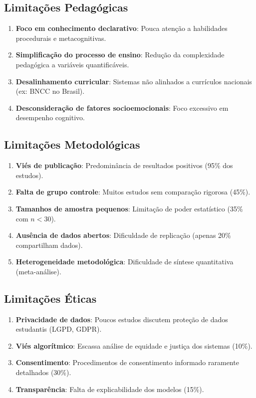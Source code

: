 \subsection{Limitações Pedagógicas}

\begin{enumerate}
    \item \textbf{Foco em conhecimento declarativo}: Pouca atenção a habilidades 
    procedurais e metacognitivas.
    \item \textbf{Simplificação do processo de ensino}: Redução da complexidade 
    pedagógica a variáveis quantificáveis.
    \item \textbf{Desalinhamento curricular}: Sistemas não alinhados a currículos 
    nacionais (ex: BNCC no Brasil).
    \item \textbf{Desconsideração de fatores socioemocionais}: Foco excessivo em 
    desempenho cognitivo.
\end{enumerate}

\subsection{Limitações Metodológicas}

\begin{enumerate}
    \item \textbf{Viés de publicação}: Predominância de resultados positivos (95\% 
    dos estudos).
    \item \textbf{Falta de grupo controle}: Muitos estudos sem comparação rigorosa 
    (45\%).
    \item \textbf{Tamanhos de amostra pequenos}: Limitação de poder estatístico 
    (35\% com $n<30$).
    \item \textbf{Ausência de dados abertos}: Dificuldade de replicação (apenas 20\% 
    compartilham dados).
    \item \textbf{Heterogeneidade metodológica}: Dificuldade de síntese quantitativa 
    (meta-análise).
\end{enumerate}

\subsection{Limitações Éticas}

\begin{enumerate}
    \item \textbf{Privacidade de dados}: Poucos estudos discutem proteção de dados 
    estudantis (LGPD, GDPR).
    \item \textbf{Viés algorítmico}: Escassa análise de equidade e justiça dos 
    sistemas (10\%).
    \item \textbf{Consentimento}: Procedimentos de consentimento informado raramente 
    detalhados (30\%).
    \item \textbf{Transparência}: Falta de explicabilidade dos modelos (15\%).
\end{enumerate}

